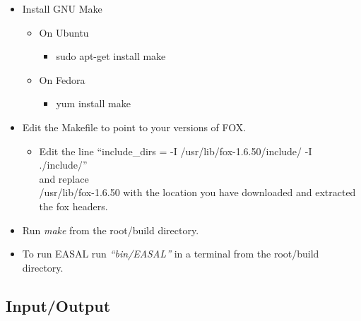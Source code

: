 \documentclass[10pt]{article}
\begin{document}
\begin{itemize}
\begin{itemize}
	   \end{itemize}
	 \item Install GNU Make
	   \begin{itemize}
	   	   \item On Ubuntu 
	   	   \begin{itemize}
			\item sudo apt-get install make
		   \end{itemize}	
		   \item On Fedora
		   \begin{itemize}
			\item yum install make
\end{itemize}
		   \end{itemize}
	 \item Edit the Makefile to point to your versions of FOX.
	   \begin{itemize}
	   	   \item Edit the line 
	   	   	 ``include\_dirs = -I /usr/lib/fox-1.6.50/include/ -I ./include/''\\
	   	   	 and replace \\
	   	   	 /usr/lib/fox-1.6.50 with the location you have downloaded and extracted the fox headers.
		\end{itemize}
	 \item Run \emph{make} from the root/build directory.
	 \item To run EASAL run \emph{``bin/EASAL''} in a terminal from the root/build directory.
\end{itemize}%





\subsection{Input/Output}
\end{document}
